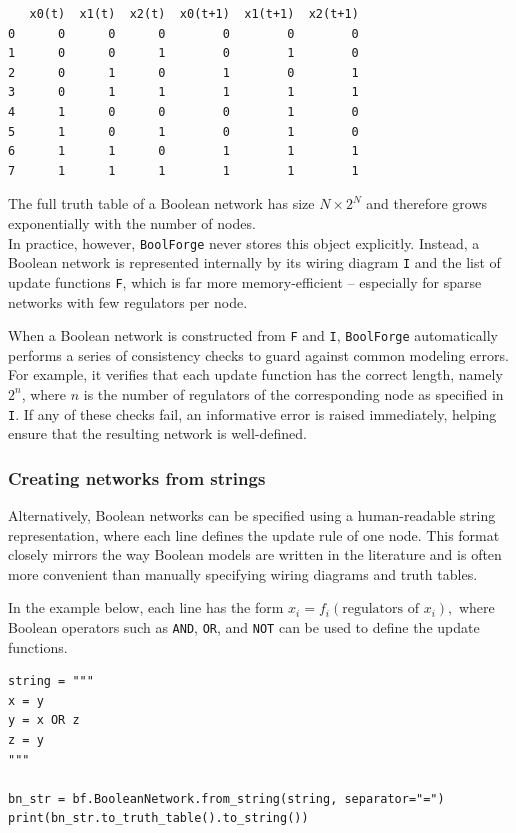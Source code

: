 \documentclass[
]{article}
\begin{document}
\begin{lstlisting}
   x0(t)  x1(t)  x2(t)  x0(t+1)  x1(t+1)  x2(t+1)
0      0      0      0        0        0        0
1      0      0      1        0        1        0
2      0      1      0        1        0        1
3      0      1      1        1        1        1
4      1      0      0        0        1        0
5      1      0      1        0        1        0
6      1      1      0        1        1        1
7      1      1      1        1        1        1
\end{lstlisting}

The full truth table of a Boolean network has size \(N \times 2^N\) and
therefore grows exponentially with the number of nodes.\\
In practice, however, \texttt{BoolForge} never stores this object
explicitly. Instead, a Boolean network is represented internally by its
wiring diagram \texttt{I} and the list of update functions \texttt{F},
which is far more memory-efficient -- especially for sparse networks
with few regulators per node.

When a Boolean network is constructed from \texttt{F} and \texttt{I},
\texttt{BoolForge} automatically performs a series of consistency checks
to guard against common modeling errors. For example, it verifies that
each update function has the correct length, namely \(2^n\), where \(n\)
is the number of regulators of the corresponding node as specified in
\texttt{I}. If any of these checks fail, an informative error is raised
immediately, helping ensure that the resulting network is well-defined.

\subsubsection{Creating networks from
strings}\label{creating-networks-from-strings}

Alternatively, Boolean networks can be specified using a human-readable
string representation, where each line defines the update rule of one
node. This format closely mirrors the way Boolean models are written in
the literature and is often more convenient than manually specifying
wiring diagrams and truth tables.

In the example below, each line has the form
\(x_i = f_i(\text{regulators of } x_i),\) where Boolean operators such
as \texttt{AND}, \texttt{OR}, and \texttt{NOT} can be used to define the
update functions.

\begin{lstlisting}
string = """
x = y
y = x OR z
z = y
"""

bn_str = bf.BooleanNetwork.from_string(string, separator="=")
print(bn_str.to_truth_table().to_string())
\end{lstlisting}
\end{document}
